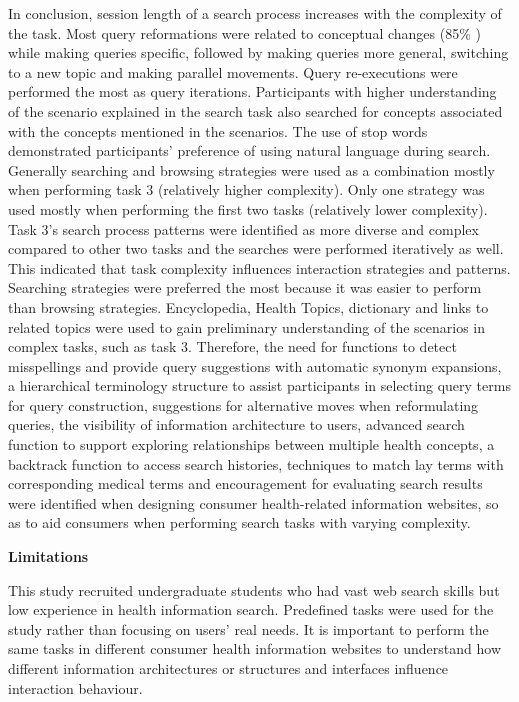 \documentclass[]{article}
\begin{document}
In conclusion, session length of a search process increases with the complexity of the task. Most query reformations were related to conceptual changes (85\% ) while making queries specific,  followed by making queries more general, switching to a new topic and making parallel movements. Query re-executions were performed the most as query iterations. Participants with higher understanding of the scenario explained in the search task also searched for concepts associated with the concepts mentioned in the scenarios. The use of stop words demonstrated participants' preference of using natural language during search. Generally searching and browsing strategies were used as a combination mostly when performing task 3 (relatively higher complexity). Only one strategy was used mostly when performing the first two tasks (relatively lower complexity). Task 3's search process patterns were identified as more diverse and complex compared to other two tasks and the searches were performed iteratively as well. This indicated that task complexity influences interaction strategies and patterns. Searching strategies were preferred the most because it was easier to perform than browsing strategies. Encyclopedia, Health Topics, dictionary and links to related topics were used to gain preliminary understanding of the scenarios in complex tasks, such as task 3. Therefore, the need for functions to detect misspellings and provide query suggestions with automatic synonym expansions, a hierarchical terminology structure to assist participants in selecting query terms for query construction, suggestions for alternative moves when reformulating queries, the visibility of information architecture to users, advanced search function to support exploring relationships between multiple health concepts, a backtrack function to access search histories, techniques to match lay terms with corresponding medical terms and encouragement for evaluating search results were identified when designing consumer health-related information websites, so as to aid consumers when performing search tasks with varying complexity.         

\textbf{Limitations}

This study recruited undergraduate students who had vast web search skills but low experience in health information search. Predefined tasks were used for the study rather than focusing on users’ real needs. It is important to perform the same tasks in different consumer health information websites to understand how different information architectures or structures and interfaces influence interaction behaviour.
\end{document}

